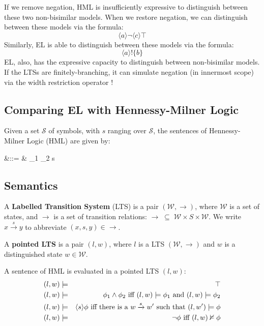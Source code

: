 If we remove negation, HML  is insufficiently expressive to distinguish between these two non-bisimilar models.
When we restore negation, we can distinguish between these models via the formula:
\[
\langle a \rangle \neg \langle c \rangle \top
\]
Similarly, EL is able to distinguish between these models via the formula:
\[
\langle a \rangle ! \{b\}
\]
EL, also, has the expressive capacity to distinguish between non-bisimilar models. If the LTSs are finitely-branching, it can simulate negation (in innermost scope) via the width restriction operator !

\subsection{Comparing EL with Hennessy-Milner Logic}

Given a set $\mathcal{S}$ of symbols, with $s$ ranging over $\mathcal{S}$, the sentences of Hennessy-Milner Logic (HML) are given by:
\begin{GRAMMAR}
  \phi 
     &\quad ::= \quad & 
  \top \fOr \phi_1 \AND \phi_2 \fOr \langle s \rangle \phi \fOr \neg \phi 
\end{GRAMMAR}
\subsection{Semantics}
A {\bf Labelled Transition System} (LTS) is a pair $(\mathcal{W}, \rightarrow)$, where $\mathcal{W}$ is a set of states, and $\rightarrow$ is a set of transition relations: $\rightarrow \; \subseteq \; \mathcal{W} \times S \times \mathcal{W}$.
We write $x \xrightarrow{s} y$ to abbreviate $(x,s,y) \in \rightarrow$.

A {\bf pointed LTS} is a pair $(l, w)$, where $l$ is a LTS $(\mathcal{W}, \rightarrow)$ and $w$ is a distinguished state $w \in \mathcal{W}$.

A sentence of HML is evaluated in a pointed LTS $(l, w)$:
\begin{eqnarray}
(l,w) & \models & \top \nonumber \\
(l,w) & \models & \phi_1 \land \phi_2 \mbox{ iff } (l,w)  \models \phi_1 \mbox { and } (l,w) \models \phi_2 \nonumber \\
(l,w) & \models & \langle s \rangle \phi \mbox{ iff there is a } w \xrightarrow{s} w' \mbox { such that } (l,w') \models \phi \nonumber \\
(l,w) & \models & \neg \phi \mbox{ iff } (l,w)  \nvDash \phi \nonumber
\end{eqnarray}


